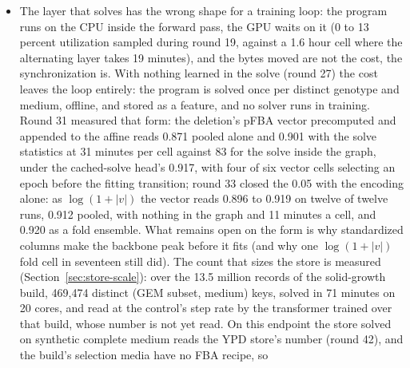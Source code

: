 \begin{itemize}
    the affine reads 0.866, the round-26 cost with the solve as with the ratios
    (round 47); GO on the logit through the affine, the path the solve takes, costs
    nothing and adds nothing (0.901 with the vector, round 50), the affine
    memorizing the training genes through 2,362 binary columns by epoch 20, and
    neither weight decay (round 59) nor reducing GO to 64 components before the
    affine (round 60: 0.906, the solve-alone number, fitting on time) recovers any of
    the average; so on this backbone the two families stay two models, and what is
    untested is a learned weighting of their logits and the transformer's affine
    read of the solve beside a graph-convolved GO token, while the average's number
    carries the selection of the best of eleven.
  \item The layer that solves has the wrong shape for a training loop: the program runs
    on the CPU inside the forward pass, the GPU waits on it (0 to 13 percent
    utilization sampled during round 19, against a 1.6 hour cell where the alternating
    layer takes 19 minutes), and the bytes moved are not the cost, the synchronization
    is. With nothing learned in the solve (round 27) the cost leaves the loop
    entirely: the program is solved once per distinct genotype and medium, offline,
    and stored as a feature, and no solver runs in training. Round 31 measured that
    form: the deletion's pFBA vector precomputed and appended to the affine reads
    0.871 pooled alone and 0.901 with the solve statistics at 31 minutes per cell
    against 83 for the solve inside the graph, under the cached-solve head's 0.917,
    with four of six vector cells selecting an epoch before the fitting transition;
    round 33 closed the 0.05 with the encoding alone: as $\log(1 + |v|)$ the vector
    reads 0.896 to 0.919 on twelve of twelve runs, 0.912 pooled, with nothing in the
    graph and 11 minutes a cell, and 0.920 as a fold ensemble. What remains open on
    the form is why standardized columns make the backbone peak before it fits (and
    why one $\log(1 + |v|)$ fold cell in seventeen still did). The count that sizes
    the store is measured (Section~\ref{sec:store-scale}): over the 13.5 million
    records of the solid-growth build, 469,474 distinct (GEM subset, medium) keys,
    solved in 71 minutes on 20 cores, and read at the control's step rate by the
    transformer trained over that build, whose number is not yet read. On this
    endpoint the store solved on synthetic complete medium reads the YPD store's
    number (round 42), and the build's selection media have no FBA recipe, so

\end{itemize}
